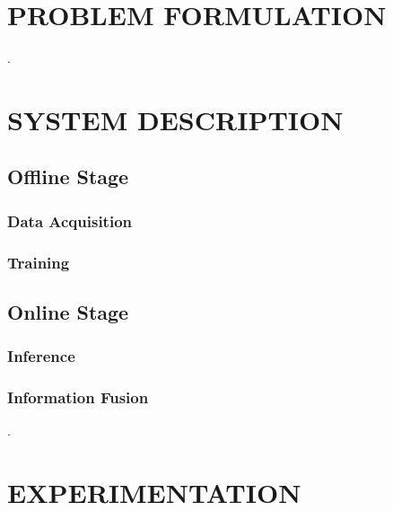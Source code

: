 \documentclass[letterpaper, 10 pt, conference]{ieeeconf}  %
\newcommand{\lorem}{
.
}
\begin{document}



\section{\label{sec-PF}PROBLEM FORMULATION}
  \lorem{}
\section{\label{sec-SD}SYSTEM DESCRIPTION}
  \subsection{Offline Stage}

    \subsubsection{Data Acquisition}

    \subsubsection{Training}

  \subsection{Online Stage}

    \subsubsection{Inference}

    \subsubsection{Information Fusion}
    \lorem{}

\section{\label{sec-EX}EXPERIMENTATION}
\end{document}
